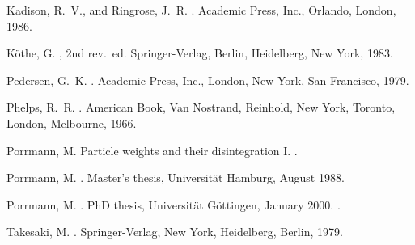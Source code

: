 \documentclass[a4paper,a4paper]{article}
\numberwithin{equation}{section}
\theoremstyle{definition}
\theoremstyle{plain}
\theoremstyle{remark}
\theoremstyle{assumption}
\begin{document}
\begin{thebibliography}{10}
{\sc Kadison, R.~V., and Ringrose, J.~R.}
.
\newblock Academic Press, Inc., Orlando, London, 1986.

{\sc K\"othe, G.}
, 2nd rev.~ed.
\newblock Springer-Verlag, Berlin, Heidelberg, New York, 1983.

{\sc Pedersen, G.~K.}
.
\newblock Academic Press, Inc., London, New York, San Francisco, 1979.

{\sc Phelps, R.~R.}
.
\newblock American Book, Van Nostrand, Reinhold, New York, Toronto, London,
  Melbourne, 1966.

{\sc Porrmann, M.}
\newblock Particle weights and their disintegration {I}.
.

{\sc Porrmann, M.}
.
\newblock Master's thesis, Universit\"at Hamburg, August 1988.

{\sc Porrmann, M.}
.
\newblock PhD thesis, Universit\"at G\"ottingen, January 2000.
.

{\sc Takesaki, M.}
.
\newblock Springer-Verlag, New York, Heidelberg, Berlin, 1979.

\end{thebibliography}
\end{document}
